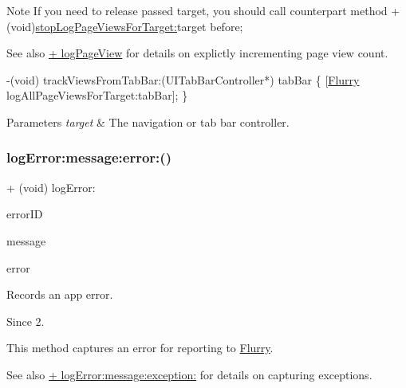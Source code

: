 \begin{DoxyNote}{Note}
If you need to release passed target, you should call counterpart method + (void)\hyperlink{interfaceFlurry_a732b380542c75c2f12d6ec90b9959aeb}{stop\+Log\+Page\+Views\+For\+Target\+:}target before;
\end{DoxyNote}
\begin{DoxySeeAlso}{See also}
\hyperlink{interfaceFlurry_a612da8f1557fa0e29d50640400d896ec}{+ log\+Page\+View} for details on explictly incrementing page view count.
\end{DoxySeeAlso}

\begin{DoxyCode}
  -(void) trackViewsFromTabBar:(UITabBarController*) tabBar 
\{
[\hyperlink{interfaceFlurry}{Flurry} logAllPageViewsForTarget:tabBar];
\}
\end{DoxyCode}



\begin{DoxyParams}{Parameters}
{\em target} & The navigation or tab bar controller. \\
\hline
\end{DoxyParams}
\mbox{\label{interfaceFlurry_a54e3619abb7f17c9b2a8f01c33cdfd81}} 
\subsubsection{\texorpdfstring{log\+Error\+:message\+:error\+:()}{logError:message:error:()}}
{\footnotesize\ttfamily + (void) log\+Error\+: \begin{DoxyParamCaption}\item[{(N\+S\+String $\ast$)}]{error\+ID }\item[{message:(N\+S\+String $\ast$)}]{message }\item[{error:(N\+S\+Error $\ast$)}]{error }\end{DoxyParamCaption}}



Records an app error. 

\begin{DoxySince}{Since}
2.
\end{DoxySince}
This method captures an error for reporting to \hyperlink{interfaceFlurry}{Flurry}.

\begin{DoxySeeAlso}{See also}
\hyperlink{interfaceFlurry_aab0b2c1426b3a120e54613fd47e6719e}{+ log\+Error\+:message\+:exception\+:} for details on capturing exceptions.
\end{DoxySeeAlso}

